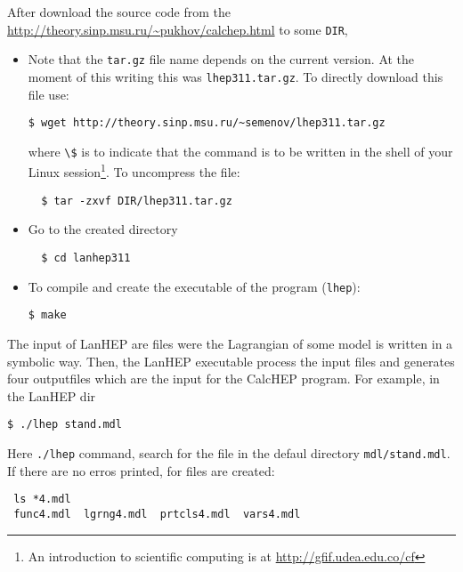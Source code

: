\begin{frame}{}
After download the source code from the \url{http://theory.sinp.msu.ru/~pukhov/calchep.html} to some \lstinline{DIR}, 
\begin{itemize}
\item Note that the \lstinline{tar.gz} file name depends on the current version. At the moment of this writing this was \lstinline{lhep311.tar.gz}. To directly download this file use:
\begin{lstlisting}
$ wget http://theory.sinp.msu.ru/~semenov/lhep311.tar.gz
\end{lstlisting}
where \lstinline{\$} is to indicate that the command is to be written in the shell of your Linux session\footnote{An introduction to scientific computing is at \url{http://gfif.udea.edu.co/cf} }.
To uncompress the file:\\
\begin{lstlisting}
  $ tar -zxvf DIR/lhep311.tar.gz
\end{lstlisting}

\item Go to the created directory
\begin{lstlisting}
  $ cd lanhep311
\end{lstlisting}

\item To compile and create the executable of the program (\lstinline{lhep}):\\
\begin{lstlisting}
$ make
\end{lstlisting}
\end{itemize}


The input of LanHEP are files were the Lagrangian of some model is written in a symbolic way. Then, the LanHEP executable process the input files and generates four outputfiles which are the input for the CalcHEP program. For example, in the LanHEP dir

\begin{lstlisting}
$ ./lhep stand.mdl
\end{lstlisting}
Here \lstinline{./lhep} command, search for the file in the defaul directory \lstinline{mdl/stand.mdl}. If there are no erros printed, for files are created:
\begin{lstlisting}
 ls *4.mdl
 func4.mdl  lgrng4.mdl  prtcls4.mdl  vars4.mdl
\end{lstlisting}
\end{frame}

